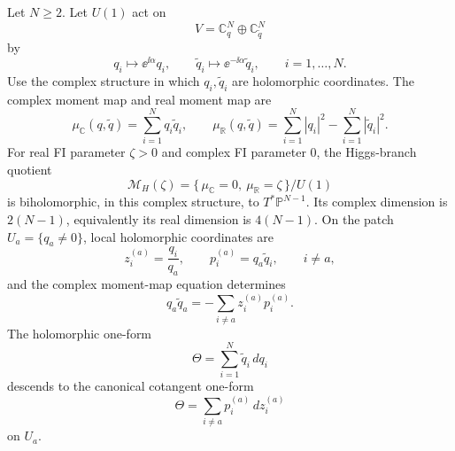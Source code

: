 \begin{proposition}
\label{prop:n2-rank-one-hyperkahler-quotient}
Let \(N\geq2\).  Let \(U(1)\) act on
\[
  V=\mathbb C^N_q\oplus\mathbb C^N_{\widetilde q}
\]
by
\[
  q_i\longmapsto \ee^{\ii\alpha}q_i,\qquad
  \widetilde q_i\longmapsto
  \ee^{-\ii\alpha}\widetilde q_i,\qquad i=1,\ldots,N .
\]
Use the complex structure in which \(q_i,\widetilde q_i\) are holomorphic
coordinates.  The complex moment map and real moment map are
\[
  \mu_{\mathbb C}(q,\widetilde q)
  =
  \sum_{i=1}^N q_i\widetilde q_i,
  \qquad
  \mu_{\mathbb R}(q,\widetilde q)
  =
  \sum_{i=1}^N |q_i|^2-\sum_{i=1}^N|\widetilde q_i|^2 .
\]
For real FI parameter \(\zeta>0\) and complex FI parameter \(0\), the
Higgs-branch quotient
\begin{equation}
  \mathcal M_H(\zeta)
  =
  \{\,\mu_{\mathbb C}=0,\ \mu_{\mathbb R}=\zeta\,\}/U(1)
  \label{eq:rank-one-hyperkahler-quotient}
\end{equation}
is biholomorphic, in this complex structure, to \(T^\ast\mathbb P^{N-1}\).
Its complex dimension is \(2(N-1)\), equivalently its real dimension is
\(4(N-1)\).  On the patch \(U_a=\{q_a\neq0\}\), local holomorphic
coordinates are
\begin{equation}
  z_i^{(a)}=\frac{q_i}{q_a},\qquad
  p_i^{(a)}=q_a\widetilde q_i,\qquad i\neq a,
  \label{eq:rank-one-hyperkahler-local-coordinates}
\end{equation}
and the complex moment-map equation determines
\begin{equation}
  q_a\widetilde q_a
  =
  -\sum_{i\neq a}z_i^{(a)}p_i^{(a)} .
  \label{eq:rank-one-hyperkahler-moment-solve}
\end{equation}
The holomorphic one-form
\[
  \Theta=\sum_{i=1}^N\widetilde q_i\,dq_i
\]
descends to the canonical cotangent one-form
\begin{equation}
  \Theta=\sum_{i\neq a}p_i^{(a)}\,dz_i^{(a)}
  \label{eq:rank-one-hyperkahler-cotangent-one-form}
\end{equation}
on \(U_a\).
\end{proposition}

